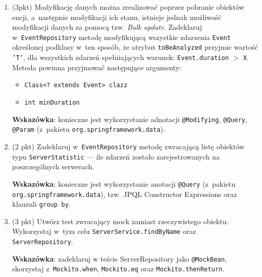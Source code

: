 \documentclass[12pt]{article}
\begin{document}
\begin{enumerate}
        \item
            (3pkt) Modyfikację danych można zrealizować poprzez pobranie obiektów encji, a~następnie modyfikacji ich stanu, istnieje jednak możliwość modyfikacji danych za pomocą tzw. \emph{Bulk update}. Zadeklaruj w~\texttt{EventRepository} metodę modyfikującą wszystkie zdarzenia \texttt{Event} określonej podklasy w~ten sposób, że atrybut \texttt{toBeAnalyzed} przyjmie wartość \texttt{'T'}, dla wszystkich zdarzeń spełniających warunek: \texttt{Event.duration} $>$ \texttt{X}. Metoda powinna przyjmować następujące argumenty:
            \begin{itemize}
                \item \texttt{Class<? extends Event> clazz}
                \item \texttt{int minDuration}
            \end{itemize}
            \textbf{Wskazówka}: konieczne jest wykorzystanie adnotacji \texttt{@Modifying}, \texttt{@Query}, \texttt{@Param} (z~pakietu \texttt{org.springframework.data}).

        \item
            (2 pkt) Zadeklaruj w~\texttt{EventRepository} metodę zwracającą listę obiektów typu \texttt{Ser\-ver\-Statis\-tic} --- ile zdarzeń zostało zarejestrowanych na poszczególnych serwerach.

            \textbf{Wskazówka}: konieczne jest wykorzystanie anotacji \texttt{@Query} (z~pakietu \texttt{org\allowbreak .spring\-frame\-work\allowbreak .data}), tzw. JPQL Constructor Expressions oraz klauzuli \texttt{group by}.

        \item
            (3 pkt) Utwórz test zwracający mock zamiast rzeczywistego obiektu. Wykorzystaj w~tym celu \texttt{ServerService.findByName} oraz \texttt{ServerRepository}.

            \textbf{Wskazówka}: zadeklaruj w teście ServerRepository jako  \texttt{@MockBean}, skorzystaj z~\texttt{Mockito\allowbreak .when}, \texttt{Mockito\allowbreak .eq} oraz \texttt{Mockito\allowbreak .thenReturn}.

    \end{enumerate}
\end{document}
